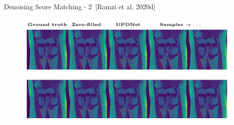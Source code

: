 \begin{frame}{Denoising Score Matching - 2~[Ramzi et al. 2020d]}
    \begin{figure}
        \centering
        \includegraphics[width=\textwidth]{Figures/clinic_applic/dsm_main.pdf}
    \end{figure}

\end{frame}
